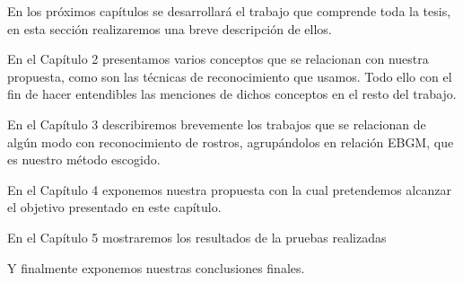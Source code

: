En los próximos capítulos se desarrollará el trabajo que comprende toda la tesis, en esta sección realizaremos una breve descripción de ellos.

En el Capítulo 2 presentamos varios conceptos que se relacionan con nuestra propuesta, como son las técnicas de reconocimiento que usamos. Todo ello con el fin de hacer entendibles las menciones de dichos conceptos en el resto del trabajo.

En el Capítulo 3 describiremos brevemente los trabajos que se relacionan de algún modo con reconocimiento de rostros, agrupándolos en relación \ac{EBGM}, que es nuestro método escogido.

En el Capítulo 4 exponemos nuestra propuesta con la cual pretendemos alcanzar el objetivo presentado en este capítulo.

En el Capítulo 5 mostraremos los resultados de la pruebas realizadas

Y finalmente exponemos nuestras conclusiones finales.
